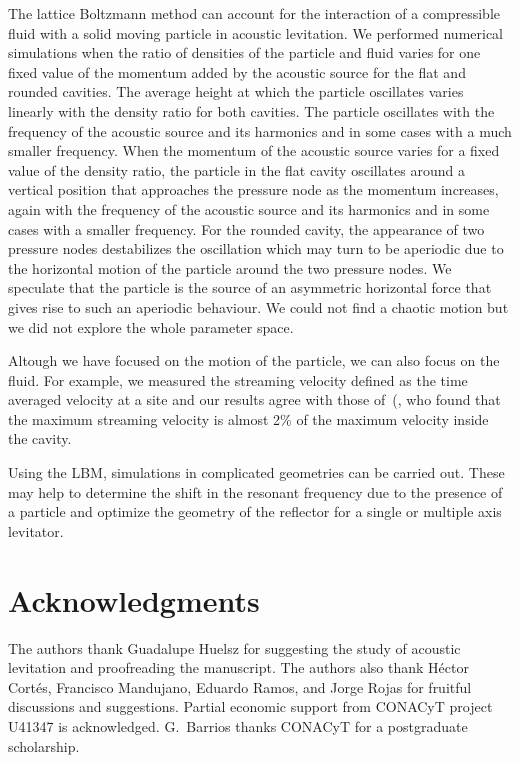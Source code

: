 The lattice Boltzmann method can account for the interaction of a compressible fluid with a 
solid moving particle in acoustic levitation. We performed  numerical simulations when the 
ratio of densities of the particle and fluid varies for one fixed value of the momentum 
added by the acoustic source for the flat and rounded cavities. The average height at which 
the particle oscillates varies linearly with the density ratio for both cavities. 
The particle oscillates with the frequency of the acoustic source and its harmonics and in 
some cases with a much smaller frequency. When the momentum of the acoustic source varies 
for a fixed value of the density ratio, the particle in the flat cavity oscillates around 
a vertical position that approaches the pressure node as the momentum increases, again 
with the frequency of the acoustic source and its harmonics and in some cases with a 
smaller frequency. For the rounded cavity, the appearance of two pressure nodes destabilizes
the oscillation which may turn to be aperiodic due to the horizontal motion of the particle 
around the two pressure nodes. We speculate that the particle is the source of an 
asymmetric horizontal force that gives rise to such an aperiodic behaviour. We
could not find a chaotic motion but we did not explore the whole parameter space.

Altough we have focused on the motion of the particle, we can also focus on
the fluid. For example, we measured the streaming velocity defined as the time averaged 
velocity at a site and our results agree with those of~(\cite{haydock05b}, who found that the 
maximum streaming velocity is almost 2\% of the maximum velocity inside the cavity.

Using the LBM, simulations in complicated geometries can be carried out. These may  
help to determine the shift in the resonant frequency due to the presence of 
a particle and optimize the geometry of the reflector for a single or multiple 
axis levitator. 


\section*{Acknowledgments}

The authors thank Guadalupe Huelsz for suggesting the study of acoustic levitation and
proofreading the manuscript. The authors also thank H\'ector Cort\'es, Francisco Mandujano,
Eduardo Ramos, and Jorge Rojas for fruitful discussions and suggestions. Partial economic 
support from CONACyT project U41347 is acknowledged. G.~Barrios thanks CONACyT for a 
postgraduate scholarship. 
